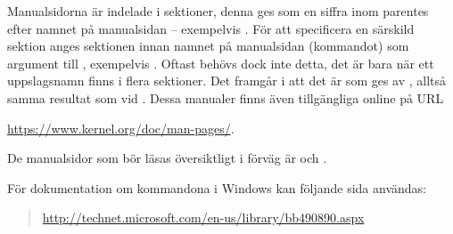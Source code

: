 Manualsidorna är indelade i sektioner, denna ges som en siffra inom parentes 
efter namnet på manualsidan -- exempelvis .
För att specificera en särskild sektion anges sektionen innan namnet på 
manualsidan (kommandot) som argument till , exempelvis .
Oftast behövs dock inte detta, det är bara när ett uppslagsnamn finns i flera 
sektioner.
Det framgår i  att det är  som ges av 
, alltså samma resultat som vid .
Dessa manualer finns även tillgängliga online på URL
\begin{center}
	\url{https://www.kernel.org/doc/man-pages/}.
\end{center}
De manualsidor som bör läsas översiktligt i förväg är  och 
.

För dokumentation om kommandona i Windows kan följande sida användas:
\begin{quote}
	\url{http://technet.microsoft.com/en-us/library/bb490890.aspx}
\end{quote}

